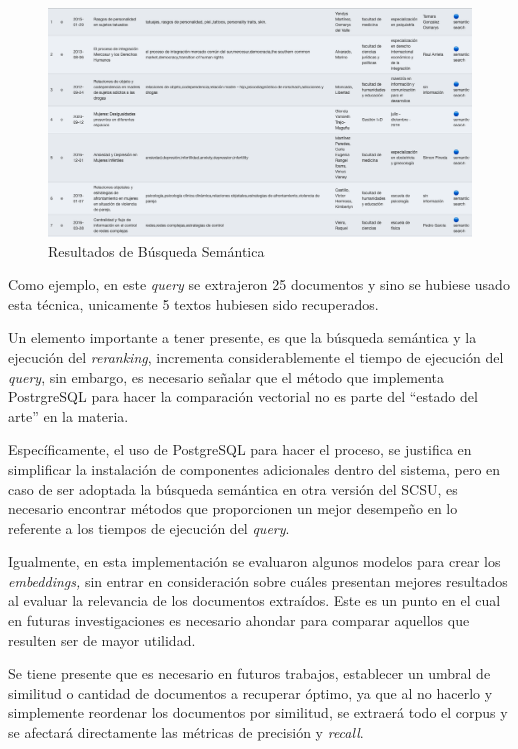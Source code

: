 \documentclass[
  12pt,
  openany]{book}
\begin{document}
\begin{figure}

{\centering \includegraphics[width=0.95\linewidth]{images/05-desarrollo/5_ciclo/resultsemantico} 

}

\caption{Resultados de Búsqueda Semántica}\label{fig:resultsemantico}
\end{figure}

Como ejemplo, en este \emph{query} se extrajeron 25 documentos y sino se hubiese usado esta técnica, unicamente 5 textos hubiesen sido recuperados.

Un elemento importante a tener presente, es que la búsqueda semántica y la ejecución del \emph{reranking}, incrementa considerablemente el tiempo de ejecución del \emph{query}, sin embargo, es necesario señalar que el método que implementa PostrgreSQL para hacer la comparación vectorial no es parte del ``estado del arte'' en la materia.

Específicamente, el uso de PostgreSQL para hacer el proceso, se justifica en simplificar la instalación de componentes adicionales dentro del sistema, pero en caso de ser adoptada la búsqueda semántica en otra versión del SCSU, es necesario encontrar métodos que proporcionen un mejor desempeño en lo referente a los tiempos de ejecución del \emph{query}.

Igualmente, en esta implementación se evaluaron algunos modelos para crear los \emph{embeddings,} sin entrar en consideración sobre cuáles presentan mejores resultados al evaluar la relevancia de los documentos extraídos. Este es un punto en el cual en futuras investigaciones es necesario ahondar para comparar aquellos que resulten ser de mayor utilidad.

Se tiene presente que es necesario en futuros trabajos, establecer un umbral de similitud o cantidad de documentos a recuperar óptimo, ya que al no hacerlo y simplemente reordenar los documentos por similitud, se extraerá todo el corpus y se afectará directamente las métricas de precisión y \emph{recall}.
\end{document}

